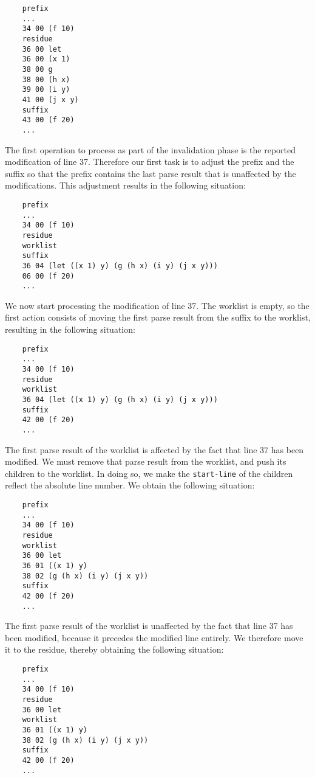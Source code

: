 {\small\begin{verbatim}
    prefix
    ...
    34 00 (f 10)
    residue
    36 00 let
    36 00 (x 1)
    38 00 g
    38 00 (h x)
    39 00 (i y)
    41 00 (j x y)
    suffix
    43 00 (f 20)
    ...
\end{verbatim}}

The first operation to process as part of the invalidation phase is
the reported modification of line 37.  Therefore our first task is to
adjust the prefix and the suffix so that the prefix contains the last
parse result that is unaffected by the modifications.  This adjustment
results in the following situation:

{\small\begin{verbatim}
    prefix
    ...
    34 00 (f 10)
    residue
    worklist
    suffix
    36 04 (let ((x 1) y) (g (h x) (i y) (j x y)))
    06 00 (f 20)
    ...
\end{verbatim}}

We now start processing the modification of line 37.  The worklist is
empty, so the first action consists of moving the first parse result
from the suffix to the worklist, resulting in the following situation:

{\small\begin{verbatim}
    prefix
    ...
    34 00 (f 10)
    residue
    worklist
    36 04 (let ((x 1) y) (g (h x) (i y) (j x y)))
    suffix
    42 00 (f 20)
    ...
\end{verbatim}}

The first parse result of the worklist is affected by the fact that
line 37 has been modified.  We must remove that parse result from the
worklist, and push its children to the worklist.  In doing so, we make
the \texttt{start-line} of the children reflect the absolute line
number.  We obtain the following situation:

{\small\begin{verbatim}
    prefix
    ...
    34 00 (f 10)
    residue
    worklist
    36 00 let
    36 01 ((x 1) y)
    38 02 (g (h x) (i y) (j x y))
    suffix
    42 00 (f 20)
    ...
\end{verbatim}}

The first parse result of the worklist is unaffected by the fact that
line 37 has been modified, because it precedes the modified line
entirely.  We therefore move it to the residue, thereby obtaining the
following situation:

{\small\begin{verbatim}
    prefix
    ...
    34 00 (f 10)
    residue
    36 00 let
    worklist
    36 01 ((x 1) y)
    38 02 (g (h x) (i y) (j x y))
    suffix
    42 00 (f 20)
    ...
\end{verbatim}}

